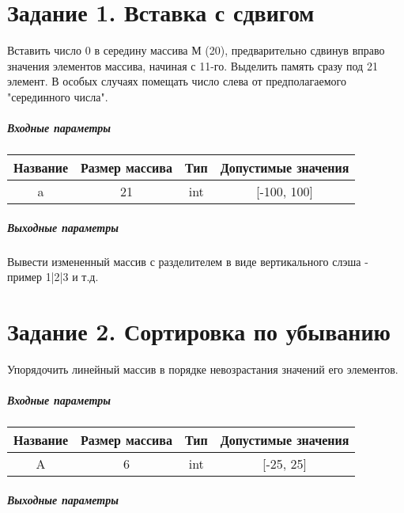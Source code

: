 \chapter*{Задание 1. Вставка с сдвигом}

Вставить число 0 в середину массива М (20), предварительно сдвинув вправо значения элементов массива, начиная с 11-го. Выделить память сразу под 21 элемент. В особых случаях помещать число слева от предполагаемого "серединного числа".

\paragraph{Входные параметры}

\begin{tabular}{ |c|c|c|c| }
\hline
Название & Размер массива & Тип & Допустимые значения \\ 
 \hline
a & 21 & int & [-100, 100] \\ 
 \hline

\end{tabular}


\paragraph{Выходные параметры}

Вывести измененный массив с разделителем в виде вертикального слэша - пример 1|2|3 и т.д.
\\
\chapter*{Задание 2. Сортировка по убыванию}

Упорядочить линейный массив в порядке невозрастания значений его элементов.

\paragraph{Входные параметры}

\begin{tabular}{ |c|c|c|c| }
\hline
Название & Размер массива & Тип & Допустимые значения \\ 
 \hline
A & 6 & int & [-25, 25] \\ 
 \hline

\end{tabular}


\paragraph{Выходные параметры}

